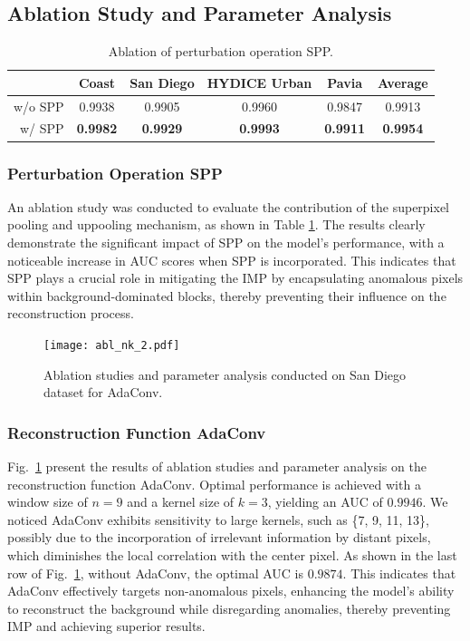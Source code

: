 \subsection{Ablation Study and Parameter Analysis}


\begin{table}[t]
  \centering
  \caption{Ablation of perturbation operation SPP.}
  \begin{tabular}{rccccc}
    \toprule
            & Coast           & San Diego       & HYDICE Urban          & Pavia           & Average \bigstrut[t]      \\
    \midrule
    w/o SPP & 0.9938          & 0.9905          & 0.9960          & 0.9847          & 0.9913 \bigstrut          \\
    w/ SPP  & \textbf{0.9982} & \textbf{0.9929} & \textbf{0.9993} & \textbf{0.9911} & \textbf{0.9954} \bigstrut \\
    \bottomrule
  \end{tabular}%
  \label{tab:abl-SPP}%
\end{table}%


\subsubsection{Perturbation Operation SPP}\label{sec:spp}
An ablation study was conducted to evaluate the contribution of the superpixel pooling and uppooling mechanism, as shown in Table \ref{tab:abl-SPP}. The results clearly demonstrate the significant impact of SPP on the model's performance, with a noticeable increase in AUC scores when SPP is incorporated. This indicates that SPP plays a crucial role in mitigating the IMP by encapsulating anomalous pixels within background-dominated blocks, thereby preventing their influence on the reconstruction process.





\begin{figure}[htbp]
  \centering
  {\texttt{[image: abl\_nk\_2.pdf]}}
  \caption{Ablation studies and parameter analysis conducted on San Diego dataset for AdaConv.}
  \label{fig:abl-nk}
\end{figure}


\subsubsection{Reconstruction Function AdaConv}
Fig.~\ref{fig:abl-nk} present the results of ablation studies and parameter analysis on the reconstruction function AdaConv. Optimal performance is achieved with a window size of $n=9$ and a kernel size of $k=3$, yielding an AUC of $0.9946$. We noticed AdaConv exhibits sensitivity to large kernels, such as \{7, 9, 11, 13\}, possibly due to the incorporation of irrelevant information by distant pixels, which diminishes the local correlation with the center pixel. As shown in the last row of Fig.~\ref{fig:abl-nk}, without AdaConv, the optimal AUC is $0.9874$. This indicates that AdaConv effectively targets non-anomalous pixels, enhancing the model's ability to reconstruct the background while disregarding anomalies, thereby preventing IMP and achieving superior results.




